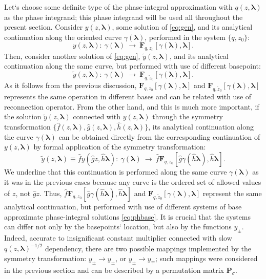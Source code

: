 \documentclass[atmp]{ipart_v1}
\def\lmbd{\bm{\lambda}}
\def\F{\bm{F}}
\def\f{\hat{f}}
\def\g{\hat{g}}
\def\h{\hat{h}}
\def\P{\bm{P}_\sigma}
\newcommand\eref[1]{\eqref{#1}}
\newcommand\predexp[1][z]{q(#1,\lmbd)^{-1/2}}
\begin{document}
Let`s choose some definite type of the phase-integral approximation with $q(z,\lmbd)$ 
as the phase integrand; this phase integrand will be used all throughout the present section. 
Consider $y(z,\lmbd)$, some solution of \eref{eq:gen}, and its analytical continuation
along the oriented curve $\gamma(\lmbd)$, performed in the system $\{q,z_0\}$:
\begin{equation}
y(z,\lmbd):\ \gamma(\lmbd)\ \longrightarrow\ \F_{q,z_0}[\gamma(\lmbd),\lmbd]. 
\end{equation}
Then, consider another solution of \eref{eq:gen}, $\tilde{y}(z,\lmbd)$, and its
analytical continuation along the same curve, but performed with use of different basepoint:
\begin{equation}
\tilde{y}(z,\lmbd):\ \gamma(\lmbd)\ \longrightarrow\ \F_{q,\tilde{z}_0}[\gamma(\lmbd),\lmbd]. 
\end{equation}
As it follows from the previous discussion, $\F_{q,z_0}[\gamma(\lmbd),\lmbd]$ and 
$\F_{q,\tilde{z}_0}[\gamma(\lmbd),\lmbd]$ represents the same operation in different bases and
can be related with use of reconnection operator. From the other hand, and this is much more important, 
if the solution $\tilde{y}(z,\lmbd)$ connected with $y(z,\lmbd)$ through
the symmetry transformation $\{\f(z,\lmbd),\g(z,\lmbd),\h(z,\lmbd)\}$, its analytical continuation
along the curve $\gamma(\lmbd)$ can be obtained directly from the 
corresponding continuation of $y(z,\lmbd)$ by formal application of the symmetry transformation:
\begin{equation}
\tilde{y}(z,\lmbd) \equiv \f y(\g z,\h \lmbd):\ 
\gamma(\lmbd)\ \longrightarrow\ \f\F_{q,z_0}[\g\gamma(\h\lmbd),\h\lmbd]. 
\end{equation}
We underline that this continuation is performed along the same curve $\gamma(\lmbd)$ as it was in 
the previous cases because any curve is the ordered set of allowed values of $z$, not $\g z$. Thus, 
$\f\F_{q,z_0}[\g\gamma(\h\lmbd),\h\lmbd]$ and $\F_{q,\tilde{z}_0}[\gamma(\lmbd),\lmbd]$ represent the 
same analytical continuation, but performed with use of different systems of base approximate phase-integral 
solutions \eref{eq:phbase}. It is crucial that the systems can differ not only by the basepoints` location,
but also by the functions $y_\pm$. Indeed, accurate to insignificant constant multiplier connected with slow
$\predexp$ dependency, there are two possible mappings implemented by the symmetry transformation: 
$y_\pm \rightarrow y_\pm$, or $y_\pm \rightarrow y_\mp$; such mappings were considered in the previous section 
and can be described by a permutation matrix $\P$.
 
\end{document}
